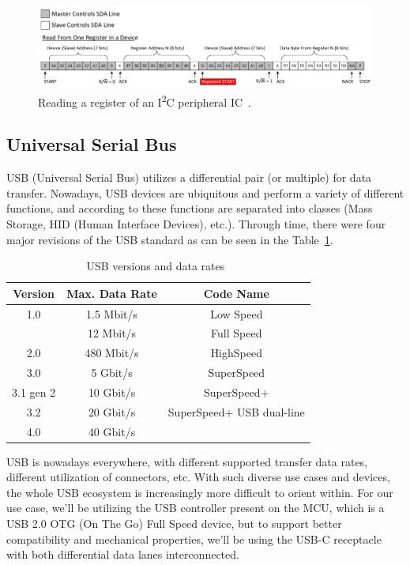\begin{figure}[H]
    \centering
    \includegraphics[width=1.1\textwidth]{obrazky/i2c_r}
    \caption{Reading a register of an I\textsuperscript{2}C peripheral IC~\cite{valdez_understanding_2015}.}
    \label{fig:i2c_r}
\end{figure}

\subsection{Universal Serial Bus}
\label{subsec:usb}
USB (Universal Serial Bus) utilizes a differential pair (or multiple) for data transfer.
Nowadays, USB devices are ubiquitous and perform a variety of different functions, and according to these functions are separated into classes (Mass Storage, HID (Human Interface Devices), etc.).
Through time, there were four major revisions of the USB standard as can be seen in the Table~\ref{tab:usb}.

\begin{table}[H]
    \centering
    \begin{tabular}{ |c|c|c| }
        \hline
        Version & Max. Data Rate & Code Name \\
        \hline
        \hline
        1.0 & 1.5 Mbit/s & Low Speed \\
        \hline
         & 12 Mbit/s & Full Speed \\
        \hline
        2.0 & 480 Mbit/s & HighSpeed \\
        \hline
        3.0 & 5 Gbit/s & SuperSpeed \\
        \hline
        3.1 gen 2 & 10 Gbit/s & SuperSpeed+ \\
        \hline
        3.2 & 20 Gbit/s & SuperSpeed+ USB dual-line \\
        \hline
        4.0 & 40 Gbit/s &  \\
        \hline
    \end{tabular}
    \caption{USB versions and data rates~\cite{noauthor_usb_2021}}
    \label{tab:usb}
\end{table}

USB is nowadays everywhere, with different supported transfer data rates, different utilization of connectors, etc.
With such diverse use cases and devices, the whole USB ecosystem is increasingly more difficult to orient within.
For our use case, we'll be utilizing the USB controller present on the MCU, which is a USB 2.0 OTG (On The Go) Full Speed device\cite{stmicro_an4879_2018}, but to support better compatibility and mechanical properties, we'll be using the USB-C receptacle with both differential data lanes interconnected.
